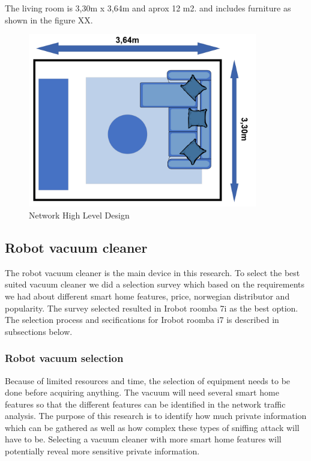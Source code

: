  The living room is 3,30m x 3,64m and aprox 12 m2. and includes furniture as shown in the figure XX. 

\begin{figure}[!ht]
    \centering
    \includegraphics[width=10cm]{figures/Living room.png}
    \caption{Network High Level Design}
    \label{fig:HLD}
\end{figure}

\subsection{Robot vacuum cleaner}
The robot vacuum cleaner is the main device in this research. To select the best suited vacuum cleaner we did a selection survey which based on the requirements we had about different smart home features, price, norwegian distributor and popularity. The survey selected resulted in Irobot roomba 7i as the best option. The selection process and secifications for Irobot roomba i7 is described in subsections below.

\subsubsection{Robot vacuum selection}
Because of limited resources and time, the selection of equipment needs to be done before acquiring anything. The vacuum will need several smart home features so that the different features can be identified in the network traffic analysis. The purpose of this research is to identify how much private information which can be gathered as well as how complex these types of sniffing attack will have to be. Selecting a vacuum cleaner with more smart home features will potentially reveal more sensitive private information.

